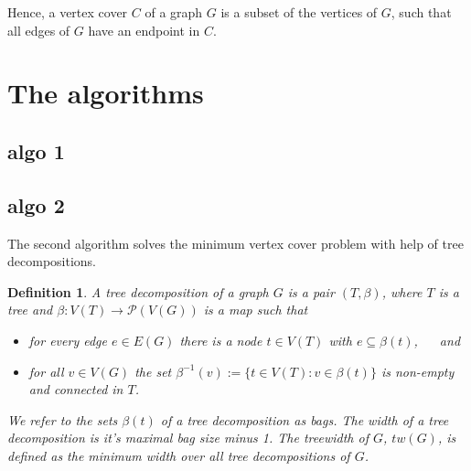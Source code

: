 \documentclass[11pt,a4paper]{article}
\newtheorem*{definition}{Definition}
\begin{document}
Hence, a vertex cover $C$ of a graph $G$ is a subset of the vertices of $G$, such that all edges of $G$ have an endpoint in $C$. \\


\section{The algorithms}

\subsection{algo 1}

\subsection{algo 2}

The second algorithm solves the minimum vertex cover problem with help of tree decompositions.

\begin{definition}
A \emph{tree decomposition} of a graph $G$ is a pair $(T, \beta)$, where $T$ is a tree and $\beta: V(T) \rightarrow \mathcal{P}(V(G))$ is a map such that
\begin{itemize}
\setlength{\itemindent}{.2in}
\item [(T1)] for every edge $e \in E(G)$ there is a node $t \in V(T)$ with $e \subseteq \beta(t)$, $\quad$ and 
\item [(T2)] for all $v \in V(G)$ the set $\beta^{-1}(v) := \{t \in V(T) : v \in \beta(t)\}$ is non-empty and connected in $T$.
\end{itemize}

\vspace*{2mm}

We refer to the sets $\beta(t)$ of a tree decomposition as \emph{bags}. The width of a tree decomposition is it's maximal bag size minus 1. The \emph{treewidth} of $G$, $tw(G)$, is defined as the minimum width over all tree decompositions of $G$. \\
\end{definition}
\end{document}
